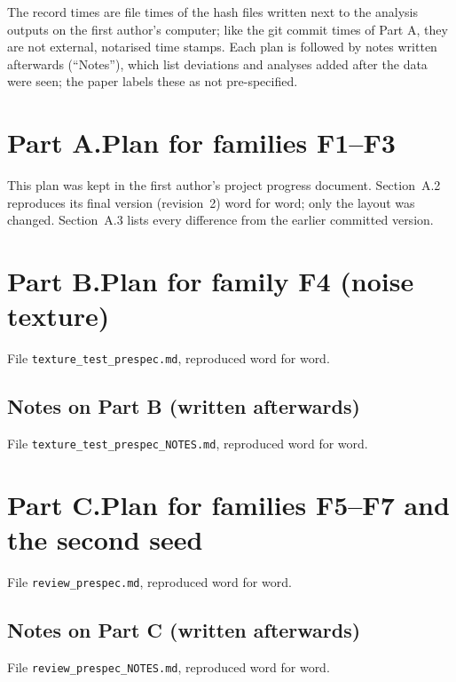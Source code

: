 \documentclass[10pt,a4paper]{article}
\begin{document}
\smallskip
The record times are file times of the hash files written next to the analysis outputs on the first author's computer; like the git
commit times of Part A, they are not external, notarised time stamps. Each plan is followed by notes written afterwards
(``Notes''), which list deviations and analyses added after the data were seen; the paper labels these as not pre-specified.

\clearpage
\section*{Part A.\quad Plan for families F1--F3}
This plan was kept in the first author's project progress document. Section~A.2 reproduces its final version (revision~2) word for
word; only the layout was changed. Section~A.3 lists every difference from the earlier committed version.



\clearpage
\section*{Part B.\quad Plan for family F4 (noise texture)}
File \texttt{texture\_test\_prespec.md}, reproduced word for word.


\subsection*{Notes on Part B (written afterwards)}
File \texttt{texture\_test\_prespec\_NOTES.md}, reproduced word for word.


\clearpage
\section*{Part C.\quad Plan for families F5--F7 and the second seed}
File \texttt{review\_prespec.md}, reproduced word for word.


\subsection*{Notes on Part C (written afterwards)}
File \texttt{review\_prespec\_NOTES.md}, reproduced word for word.

\end{document}
